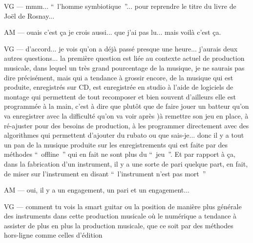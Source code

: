 VG — mmm... “ l'homme symbiotique ”... pour reprendre le titre du livre de Joël de Rosnay... 

AM — ouais c'est ça je crois aussi... que j'ai pas lu... mais voilà c'est ça.

VG — d'accord... je vois qu'on a déjà passé presque une heure... j'aurais deux autres questions... la première question est liée au contexte actuel de production musicale, dans lequel un très grand pourcentage de la musique, je ne saurais pas dire précisément, mais qui a tendance à grossir encore, de la musique qui est produite, enregistrés sur CD, est enregistrée en studio à l'aide de logiciels de montage qui permettent de tout recomposer et bien souvent d'ailleurs elle est programmée à la main, c'est à dire que plutôt que de faire jouer un batteur qu'on va enregistrer avec la difficulté qu'on va voir après )à remettre son jeu en place, à ré-ajuster pour des besoins de production, à les programmer directement avec des algorithmes qui permettent d'ajouter du rubato ou que sais-je... donc il y a tout un pan de la musique produite sur les enregistrements qui est faite par des méthodes “ offline ” qui en fait ne sont plus du “ jeu ”.  Et par rapport à ça, dans la fabrication d'un instrument, il y a une sorte de pari quelque part, en fait, de miser sur l'instrument en disant “ l'instrument n'est pas mort ” 

AM — oui, il y a un engagement, un pari et un engagement... 

VG — comment tu vois la smart guitar ou la position de manière plus générale des instruments dans cette production musicale où le numérique a tendance à assister de plus en plus la production musicale, que ce soit par des méthodes hors-ligne comme celles d'édition

